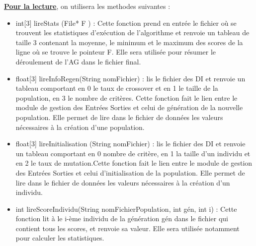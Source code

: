 \documentclass[a4paper,11pt]{article}
\begin{document}
			\underline{\bf Pour la lecture}, on utilisera les methodes suivantes :\\
			\begin{itemize}
				\item int[3] lireStats (File* F ) : Cette fonction prend en entrée le fichier où se trouvent les statistiques d’exécution de l’algorithme et renvoie un tableau de taille 3 contenant la moyenne, le minimum et le maximum des scores de la ligne où se trouve le pointeur F. Elle sera utilisée pour résumer le déroulement de l'AG dans le fichier final.\vspace{0.2cm}
				\item float[3] lireInfoRegen(String nomFichier) : lis le fichier des DI et renvoie un tableau comportant en 0 le taux de crossover et en 1 le taille de la population, en 3 le nombre de critères.
					Cette fonction fait le lien entre le module de gestion des Entrées Sorties et celui de génération de la nouvelle population.
					Elle permet de lire dans le fichier de données les valeurs nécessaires à la création d’une population.\vspace{0.2cm}
				\item float[3] lireInitialisation (String nomFichier) : lis le fichier des DI et renvoie un tableau comportant en 0 nombre de critère, en 1 la taille d’un individu et en 2 le taux de mutation.Cette fonction fait le lien entre le module de gestion des Entrées Sorties et celui d’initialisation de la population. 
					Elle permet de lire dans le fichier de données les valeurs nécessaires à la création d’un individu.\vspace{0.2cm}

				\item int lireScoreIndividu(String nomFichierPopulation, int gén, int i) : Cette fonction lit à le i-ème individu de la génération gén dans le fichier qui contient tous les scores, et renvoie sa valeur. Elle sera utilisée notamment pour calculer les statistiques.

			\end{itemize}
			
\end{document}

